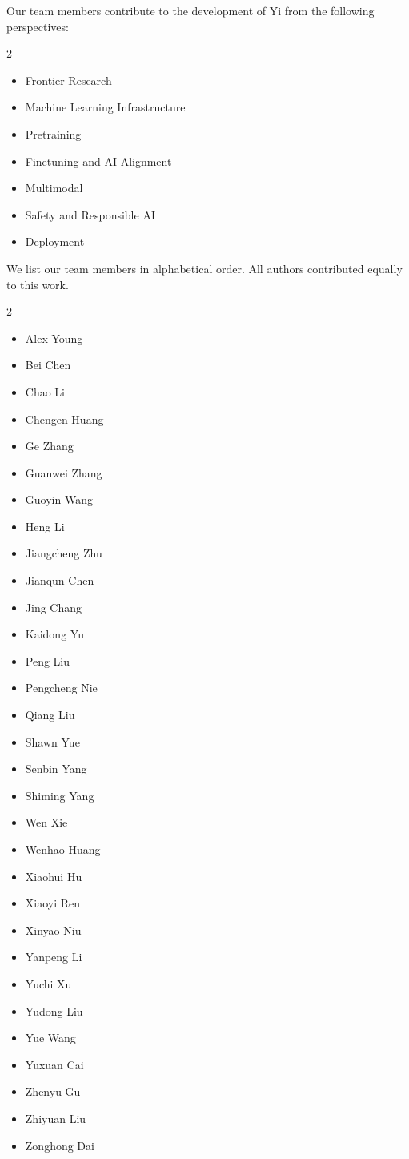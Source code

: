 
Our team members contribute to the development of Yi from the following perspectives: 

\begin{multicols}{2}
\begin{itemize}
    \item Frontier Research
    \item Machine Learning Infrastructure
    \item Pretraining
    \item Finetuning and AI Alignment
    \item Multimodal
    \item Safety and Responsible AI 
    \item Deployment
\end{itemize}
\end{multicols}

We list our team members in alphabetical order. All authors contributed equally to this work. 

\begin{multicols}{2}
\begin{itemize}
\item Alex Young
\item Bei Chen
\item Chao Li
\item Chengen Huang
\item Ge Zhang
\item Guanwei Zhang
\item Guoyin Wang
\item Heng Li
\item Jiangcheng Zhu
\item Jianqun Chen
\item Jing Chang
\item Kaidong Yu
\item Peng Liu
\item Pengcheng Nie
\item Qiang Liu
\item Shawn Yue
\item Senbin Yang
\item Shiming Yang
\item Wen Xie
\item Wenhao Huang
\item Xiaohui Hu
\item Xiaoyi Ren
\item Xinyao Niu
\item Yanpeng Li
\item Yuchi Xu
\item Yudong Liu
\item Yue Wang
\item Yuxuan Cai
\item Zhenyu Gu
\item Zhiyuan Liu
\item Zonghong Dai
\end{itemize}
\end{multicols}